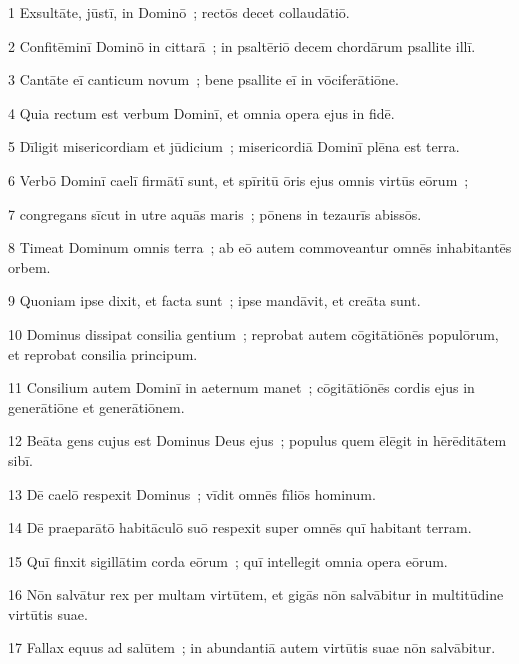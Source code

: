 
\psalmVerse
  {\phantom{00}1}
  {Exsultāte, jūstī, in Dominō~; rectōs decet collaudātiō.}


\psalmVerse
  {\phantom{00}2}
  {Confitēminī Dominō in cittarā~; in psaltēriō decem chordārum psallite illī.}


\psalmVerse
  {\phantom{00}3}
  {Cantāte eī canticum novum~; bene psallite eī in vōciferātiōne.}


\psalmVerse
  {\phantom{00}4}
  {Quia rectum est verbum Dominī, et omnia opera ejus in fidē.}


\psalmVerse
  {\phantom{00}5}
  {Dīligit misericordiam et jūdicium~; misericordiā Dominī plēna est terra.}


\psalmVerse
  {\phantom{00}6}
  {Verbō Dominī caelī firmātī sunt, et spīritū ōris ejus omnis virtūs eōrum~;}


\psalmVerse
  {\phantom{00}7}
  {congregans sīcut in utre aquās maris~; pōnens in tezaurīs abissōs.}


\psalmVerse
  {\phantom{00}8}
  {Timeat Dominum omnis terra~; ab eō autem commoveantur omnēs inhabitantēs orbem.}


\psalmVerse
  {\phantom{00}9}
  {Quoniam ipse dixit, et facta sunt~; ipse mandāvit, et creāta sunt.}


\psalmVerse
  {\phantom{0}10}
  {Dominus dissipat consilia gentium~; reprobat autem cōgitātiōnēs populōrum, et reprobat consilia principum.}


\psalmVerse
  {\phantom{0}11}
  {Consilium autem Dominī in aeternum manet~; cōgitātiōnēs cordis ejus in generātiōne et generātiōnem.}


\psalmVerse
  {\phantom{0}12}
  {Beāta gens cujus est Dominus Deus ejus~; populus quem ēlēgit in hērēditātem sibī.}


\psalmVerse
  {\phantom{0}13}
  {Dē caelō respexit Dominus~; vīdit omnēs fīliōs hominum.}


\psalmVerse
  {\phantom{0}14}
  {Dē praeparātō habitāculō suō respexit super omnēs quī habitant terram.}


\psalmVerse
  {\phantom{0}15}
  {Quī finxit sigillātim corda eōrum~; quī intellegit omnia opera eōrum.}


\psalmVerse
  {\phantom{0}16}
  {Nōn salvātur rex per multam virtūtem, et gigās nōn salvābitur in multitūdine virtūtis suae.}


\psalmVerse
  {\phantom{0}17}
  {Fallax equus ad salūtem~; in abundantiā autem virtūtis suae nōn salvābitur.}


